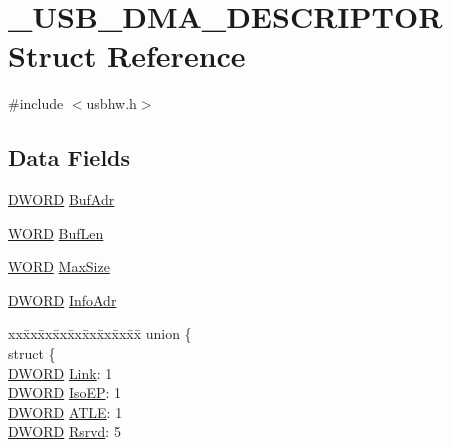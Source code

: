\hypertarget{struct___u_s_b___d_m_a___d_e_s_c_r_i_p_t_o_r}{
\section{\_\-USB\_\-DMA\_\-DESCRIPTOR Struct Reference}
\label{struct___u_s_b___d_m_a___d_e_s_c_r_i_p_t_o_r}
}


{\ttfamily \#include $<$usbhw.h$>$}

\subsection*{Data Fields}
\begin{DoxyCompactItemize}
\item 
\hyperlink{type_8h_ad342ac907eb044443153a22f964bf0af}{DWORD} \hyperlink{struct___u_s_b___d_m_a___d_e_s_c_r_i_p_t_o_r_a057b0f9ba2a9d4251d7e5a41db249f31}{BufAdr}
\item 
\hyperlink{type_8h_a197942eefa7db30960ae396d68339b97}{WORD} \hyperlink{struct___u_s_b___d_m_a___d_e_s_c_r_i_p_t_o_r_ac463cf64df0fba444245360ab3391063}{BufLen}
\item 
\hyperlink{type_8h_a197942eefa7db30960ae396d68339b97}{WORD} \hyperlink{struct___u_s_b___d_m_a___d_e_s_c_r_i_p_t_o_r_aa53121f397d5b937dcee535b938634fa}{MaxSize}
\item 
\hyperlink{type_8h_ad342ac907eb044443153a22f964bf0af}{DWORD} \hyperlink{struct___u_s_b___d_m_a___d_e_s_c_r_i_p_t_o_r_a151d903bfb9136dc83f3ecdcbddcf31f}{InfoAdr}
\item 
\begin{tabbing}
xx\=xx\=xx\=xx\=xx\=xx\=xx\=xx\=xx\=\kill
union \{\\
\>struct \{\\
\>\>\hyperlink{type_8h_ad342ac907eb044443153a22f964bf0af}{DWORD} \hyperlink{struct___u_s_b___d_m_a___d_e_s_c_r_i_p_t_o_r_a2bbfd9b40166a3222981f37e2031110d}{Link}: 1\\
\>\>\hyperlink{type_8h_ad342ac907eb044443153a22f964bf0af}{DWORD} \hyperlink{struct___u_s_b___d_m_a___d_e_s_c_r_i_p_t_o_r_a2367169731085616ca27edbf975bf4eb}{IsoEP}: 1\\
\>\>\hyperlink{type_8h_ad342ac907eb044443153a22f964bf0af}{DWORD} \hyperlink{struct___u_s_b___d_m_a___d_e_s_c_r_i_p_t_o_r_ac2bacb61775d42b4f06bdf9432d30c9d}{ATLE}: 1\\
\>\>\hyperlink{type_8h_ad342ac907eb044443153a22f964bf0af}{DWORD} \hyperlink{struct___u_s_b___d_m_a___d_e_s_c_r_i_p_t_o_r_ae37ab54b2bf6ea4f9462f8d70f101465}{Rsrvd}: 5\\

\end{tabbing}
\end{DoxyCompactItemize}
